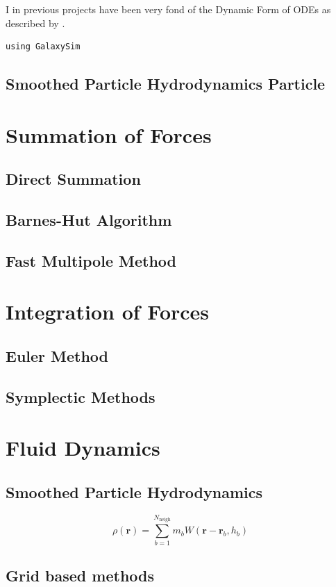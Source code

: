 \documentclass[11pt]{article}
\begin{document}
I in previous projects have been very fond of the Dynamic Form of ODEs as described by \cite{landauComputationalPhysics2024}.

\begin{verbatim}
using GalaxySim
\end{verbatim}
\subsection{Smoothed Particle Hydrodynamics Particle}
\label{sec:org2bcef50}
\section{Summation of Forces}
\label{sec:orge1350f5}
\subsection{Direct Summation}
\label{sec:orgd8010bd}
\subsection{Barnes-Hut Algorithm}
\label{sec:org504c773}
\subsection{Fast Multipole Method}
\label{sec:org237c91b}
\section{Integration of Forces}
\label{sec:org8e08f53}
\subsection{Euler Method}
\label{sec:orgc9104c1}
\subsection{Symplectic Methods}
\label{sec:org7b1a0b8}
\section{Fluid Dynamics}
\label{sec:org0aa7e21}
\subsection{Smoothed Particle Hydrodynamics}
\label{sec:orgc0c39c6}
\[
\rho(\mathbf{r}) = \sum_{b=1}^{N_{\mathrm{neigh}}} m_{b} W(\mathbf{r}-\mathbf{r}_b, h_b)
\]
\subsection{Grid based methods}
\label{sec:orgdaa2b30}
\end{document}
